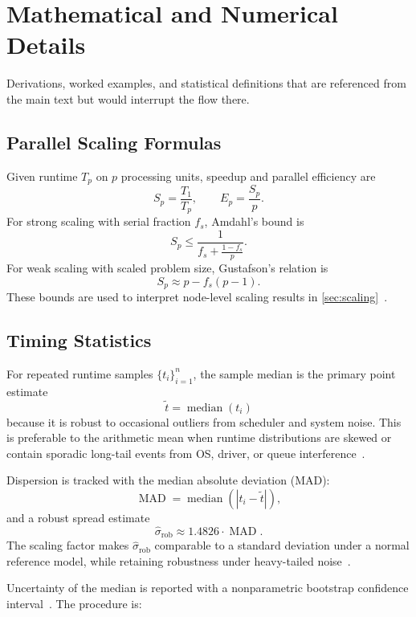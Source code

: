 \chapter{Mathematical and Numerical Details}\label{app:math-details}

Derivations, worked examples, and statistical definitions that are
referenced from the main text but would interrupt the flow there.

\section{Parallel Scaling Formulas}\label{app:scaling-formulas}

Given runtime $T_p$ on $p$ processing units, speedup and parallel efficiency are
\[
  S_p=\frac{T_1}{T_p},
  \qquad
  E_p=\frac{S_p}{p}.
\]
For strong scaling with serial fraction $f_s$, Amdahl's bound is
\[
  S_p \le \frac{1}{f_s + \frac{1-f_s}{p}}.
\]
For weak scaling with scaled problem size, Gustafson's relation is
\[
  S_p \approx p - f_s(p-1).
\]
These bounds are used to interpret node-level scaling results in
\cref{sec:scaling}~\cite{amdahl1967validity,gustafson1988reevaluating}.

\section{Timing Statistics}\label{app:timing-stats}

For repeated runtime samples $\{t_i\}_{i=1}^n$, the sample median is the
primary point estimate
\[
  \tilde t = \operatorname{median}(t_i)
\]
because it is robust to occasional outliers from
scheduler and system noise. This is preferable to the arithmetic mean when
runtime distributions are skewed or contain sporadic long-tail events from OS,
driver, or queue interference~\cite{jain1991art,kalibera2013rigorous}.

Dispersion is tracked with the median absolute deviation (MAD):
\[
  \operatorname{MAD} = \operatorname{median}\!\left(|t_i-\tilde t|\right),
\]
and a robust spread estimate
\[
  \hat\sigma_{\mathrm{rob}} \approx 1.4826 \cdot \operatorname{MAD}.
\]
The scaling factor makes $\hat\sigma_{\mathrm{rob}}$ comparable to a standard
deviation under a normal reference model, while retaining robustness under
heavy-tailed noise~\cite{huber2009robust}.

Uncertainty of the median is reported with a nonparametric bootstrap
confidence interval~\cite{efron1994bootstrap}. The procedure is:

